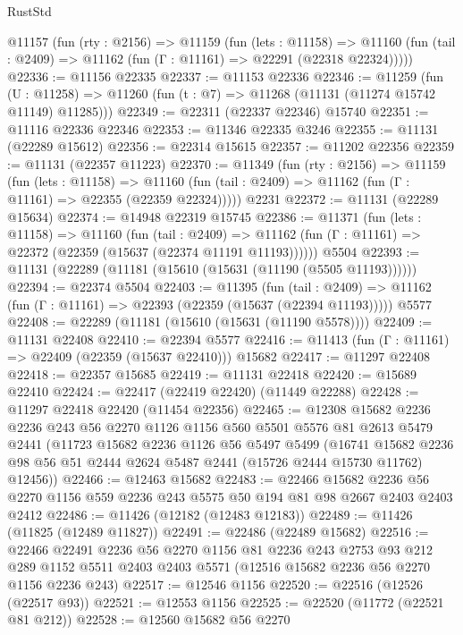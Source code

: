 \begin{lexlean}{RustStd}
\begin{coremodule}
  @11157
    (fun (rty : @2156) =>
    @11159
      (fun (lets : @11158) =>
      @11160 (fun (tail : @2409) => @11162 (fun (Γ : @11161) => @22291 (@22318 @22324)))))
@22336 := @11156 @22335
@22337 := @11153 @22336
@22346 := @11259
    (fun (U : @11258) => @11260 (fun (t : @7) => @11268 (@11131 (@11274 @15742 @11149) @11285)))
@22349 := @22311 (@22337 @22346) @15740
@22351 := @11116 @22336 @22346
@22353 := @11346 @22335 @3246
@22355 := @11131 (@22289 @15612)
@22356 := @22314 @15615
@22357 := @11202 @22356
@22359 := @11131 (@22357 @11223)
@22370 := @11349
    (fun (rty : @2156) =>
    @11159
      (fun (lets : @11158) =>
      @11160 (fun (tail : @2409) => @11162 (fun (Γ : @11161) => @22355 (@22359 @22324)))))
    @2231
@22372 := @11131 (@22289 @15634)
@22374 := @14948 @22319 @15745
@22386 := @11371
    (fun (lets : @11158) =>
    @11160
      (fun (tail : @2409) =>
      @11162 (fun (Γ : @11161) => @22372 (@22359 (@15637 (@22374 @11191 @11193))))))
    @5504
@22393 := @11131 (@22289 (@11181 (@15610 (@15631 (@11190 (@5505 @11193))))))
@22394 := @22374 @5504
@22403 := @11395
    (fun (tail : @2409) => @11162 (fun (Γ : @11161) => @22393 (@22359 (@15637 (@22394 @11193)))))
    @5577
@22408 := @22289 (@11181 (@15610 (@15631 (@11190 @5578))))
@22409 := @11131 @22408
@22410 := @22394 @5577
@22416 := @11413 (fun (Γ : @11161) => @22409 (@22359 (@15637 @22410))) @15682
@22417 := @11297 @22408
@22418 := @22357 @15685
@22419 := @11131 @22418
@22420 := @15689 @22410
@22424 := @22417 (@22419 @22420) (@11449 @22288)
@22428 := @11297 @22418 @22420 (@11454 @22356)
@22465 := @12308
    @15682
    @2236
    @2236
    @243
    @56
    @2270
    @1126
    @1156
    @560
    @5501
    @5576
    @81
    @2613
    @5479
    @2441
    (@11723
      @15682
      @2236
      @1126
      @56
      @5497
      @5499
      (@16741 @15682 @2236 @98 @56 @51 @2444 @2624 @5487 @2441 (@15726 @2444 @15730 @11762) @12456))
@22466 := @12463 @15682
@22483 := @22466
    @15682
    @2236
    @56
    @2270
    @1156
    @559
    @2236
    @243
    @5575
    @50
    @194
    @81
    @98
    @2667
    @2403
    @2403
    @2412
@22486 := @11426 (@12182 (@12483 @12183))
@22489 := @11426 (@11825 (@12489 @11827))
@22491 := @22486 (@22489 @15682)
@22516 := @22466
    @22491
    @2236
    @56
    @2270
    @1156
    @81
    @2236
    @243
    @2753
    @93
    @212
    @289
    @1152
    @5511
    @2403
    @2403
    @5571
    (@12516 @15682 @2236 @56 @2270 @1156 @2236 @243)
@22517 := @12546 @1156
@22520 := @22516 (@12526 (@22517 @93))
@22521 := @12553 @1156
@22525 := @22520 (@11772 (@22521 @81 @212))
@22528 := @12560 @15682 @56 @2270

\end{coremodule}
\end{lexlean}
